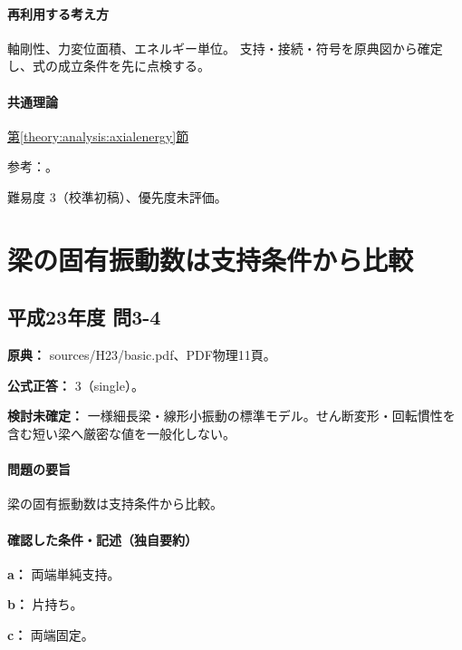 \paragraph{再利用する考え方} 軸剛性、力変位面積、エネルギー単位。 支持・接続・符号を原典図から確定し、式の成立条件を先に点検する。

\paragraph{共通理論} \hyperref[theory:analysis:axialenergy]{第\ref*{theory:analysis:axialenergy}節}

\par 参考：\cite{mit_material_elastic2000}。

\par 難易度 3（校準初稿）、優先度未評価。

\section{梁の固有振動数は支持条件から比較}

\subsection{平成23年度 問3-4}
\label{q:h23-reg-basic-3-4}

\noindent\textbf{原典：} sources/H23/basic.pdf、PDF物理11頁。

\textbf{公式正答：} 3（single）。

\par\textbf{検討未確定：} 一様細長梁・線形小振動の標準モデル。せん断変形・回転慣性を含む短い梁へ厳密な値を一般化しない。

\paragraph{問題の要旨} 梁の固有振動数は支持条件から比較。

\paragraph{確認した条件・記述（独自要約）}\mbox{}\par

\noindent\textbf{a：} 両端単純支持。\par

\noindent\textbf{b：} 片持ち。\par

\noindent\textbf{c：} 両端固定。\par

